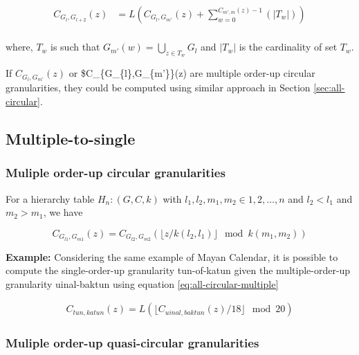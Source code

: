 \documentclass[12pt]{article}
\begin{document}
\begin{equation} \label{eq:multifromsingle-quasi2}
\begin{split}
C_{G_l,G_{l+2}}(z) & = L(C_{G_{l},G_{m'}}(z) + \sum_{w=0}^{C_{m',m}(z) -1}(\vert T_{w} \vert))\\
\end{split}
\end{equation}

where, \(T_w\) is such that \(G_{m'}(w) = \bigcup_{z \in T_w}G_{l}\) and \(\vert T_w \vert\) is the cardinality of set \(T_w\).

If \(C_{G_{l},G_{m'}}(z)\) or \$C\_\{G\_\{l\},G\_\{m'\}\}(z) are multiple order-up circular granularities, they could be computed using similar approach in Section \ref{sec:all-circular}.

\hypertarget{sec:multiple-to-single}{%
\subsection{Multiple-to-single}\label{sec:multiple-to-single}}

\hypertarget{sec:all-circular-multiple}{%
\subsubsection{Muliple order-up circular granularities}\label{sec:all-circular-multiple}}

For a hierarchy table \(H_n: (G, C, k)\) with \(l_1, l_2, m_1, m_2 \in {1, 2, \dots, n}\) and \(l_2<l_1\) and \(m_2>m_1\), we have

\begin{equation} \label{eq:all-circular-multiple}
C_{G_{l1}, G_{m1}}(z) = C_{G_{l2}, G_{m2}}(\lfloor z/k(l_2,l_1) \rfloor\mod k(m_1, m_2))
\end{equation}

\textbf{Example:} Considering the same example of Mayan Calendar, it is possible to compute the single-order-up granularity tun-of-katun given the multiple-order-up granularity uinal-baktun using equation \ref{eq:all-circular-multiple}

\begin{equation} \label{eq10}
\begin{split}
C_{tun, katun}(z) =  L(\lfloor C_{uinal, baktun}(z)/18\rfloor \mod 20) 
\end{split}
\end{equation}

\hypertarget{sec:quasi-circular-multiple}{%
\subsubsection{Muliple order-up quasi-circular granularities}\label{sec:quasi-circular-multiple}}
\end{document}
